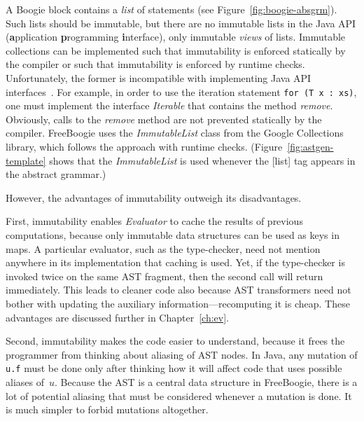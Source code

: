 \documentclass{llncs}
\newcommand{\jmlCode}{\lstinline[style=jml,basicstyle=\normalsize]}
\def\fb#1{{\bf #1}} %
\begin{document}
A Boogie block contains a \emph{list} of statements (see
Figure~\ref{fig:boogie-absgrm}). Such lists should be immutable,
but there are no immutable lists in the Java API (\fb application
\fb programming \fb interface), only immutable \emph{views} of
lists. Immutable collections can be implemented such that
immutability is enforced statically by the compiler or such
that immutability is enforced by runtime checks. Unfortunately,
the former is incompatible with implementing Java API
interfaces~\cite{javaCollectFaq}. For example, in order to use
the iteration statement
\jmlCode|for (T x : xs)|,
one must implement the interface \textit{Iterable} that
contains the method \textit{remove}. Obviously, calls to
the \textit{remove} method are not prevented statically by
the compiler. FreeBoogie uses the \textit{ImmutableList}
class from the Google Collections~\cite{google-collect}
library, which follows the approach with runtime checks.
(Figure~\ref{fig:astgen-template} shows that the
\textit{ImmutableList} is used whenever the [list] tag appears in
the abstract grammar.)

However, the advantages of immutability outweigh its
disadvantages.

First, immutability enables \textit{Evaluator} to cache the
results of previous computations, because only immutable data
structures can be used as keys in maps. A particular evaluator,
such as the type-checker, need not mention anywhere in its
implementation that caching is used. Yet, if the type-checker
is invoked twice on the same AST fragment, then the second call
will return immediately. This leads to cleaner code also because
AST transformers need not bother with updating the auxiliary
information---recomputing it is cheap. These advantages are
discussed further in Chapter~\ref{ch:ev}.

Second, immutability makes the code easier to understand, because
it frees the programmer from thinking about aliasing of AST nodes.
In Java, any mutation of \jmlCode|u.f| must be done only after
thinking how it will affect code that uses possible aliases of~$u$.
Because the AST is a central data structure in FreeBoogie, there
is a lot of potential aliasing that must be considered whenever
a mutation is done. It is much simpler to forbid mutations altogether.
\end{document}
